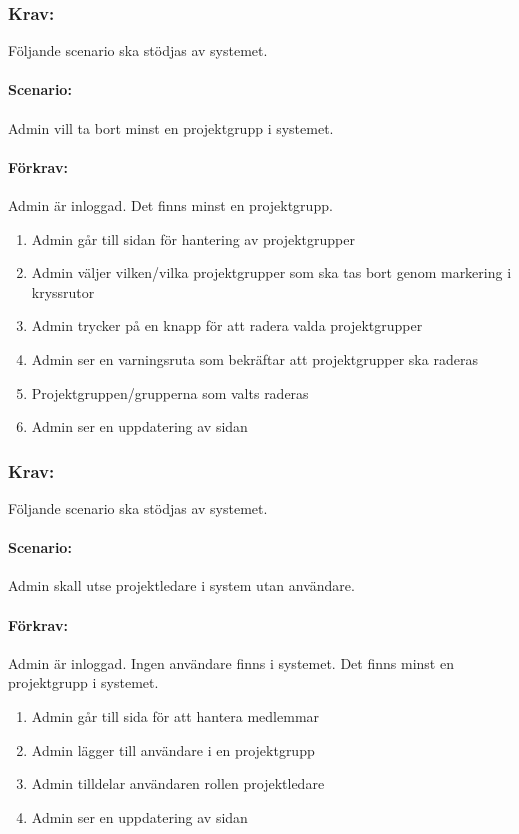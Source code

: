 \documentclass[paper=a4, fontsize=11pt,twoside]{article}
\begin{document}
\subsubsection{Krav:} 
Följande scenario ska stödjas av systemet.
\paragraph{Scenario:}
Admin vill ta bort minst en projektgrupp i systemet.
\paragraph{Förkrav:}
Admin är inloggad. Det finns minst en projektgrupp.
\begin{enumerate}
\item Admin går till sidan för hantering av projektgrupper
\item Admin väljer vilken/vilka projektgrupper som ska tas bort genom markering i kryssrutor
\item Admin trycker på en knapp för att radera valda projektgrupper
\item Admin ser en varningsruta som bekräftar att projektgrupper ska raderas
\item Projektgruppen/grupperna som valts raderas
\item Admin ser en uppdatering av sidan
\end{enumerate}

\subsubsection{Krav:} Följande scenario ska stödjas av systemet. 
\paragraph{Scenario:}
Admin skall utse projektledare i system utan användare.
\paragraph{Förkrav:}
Admin är inloggad. Ingen användare finns i systemet. Det finns minst en projektgrupp i systemet.
\begin{enumerate}
\item Admin går till sida för att hantera medlemmar
\item Admin lägger till användare i en projektgrupp
\item Admin tilldelar användaren rollen projektledare
\item Admin ser en uppdatering av sidan
\end{enumerate}
\end{document}
